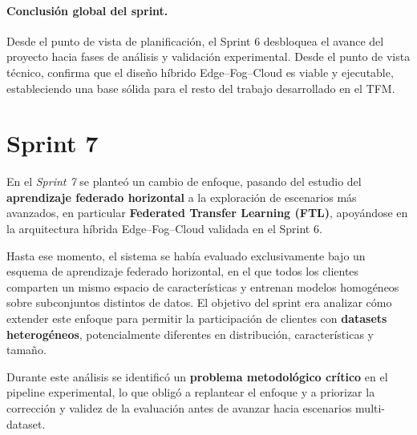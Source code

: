 \documentclass{report}
\begin{document}
\vspace{0.15em}
\paragraph{Conclusión global del sprint.}
Desde el punto de vista de planificación, el Sprint 6 desbloquea el avance del proyecto hacia fases de análisis y validación experimental. Desde el punto de vista técnico, confirma que el diseño híbrido Edge--Fog--Cloud es viable y ejecutable, estableciendo una base sólida para el resto del trabajo desarrollado en el TFM.




\section{Sprint 7}
\label{sect:Sp7}
En el \textit{Sprint 7} se planteó un cambio de enfoque, pasando del estudio del \textbf{aprendizaje federado horizontal} a la exploración de escenarios más avanzados, en particular \textbf{Federated Transfer Learning (FTL)}, apoyándose en la arquitectura híbrida Edge--Fog--Cloud validada en el Sprint 6.

Hasta ese momento, el sistema se había evaluado exclusivamente bajo un esquema de aprendizaje federado horizontal, en el que todos los clientes comparten un mismo espacio de características y entrenan modelos homogéneos sobre subconjuntos distintos de datos. El objetivo del sprint era analizar cómo extender este enfoque para permitir la participación de clientes con \textbf{datasets heterogéneos}, potencialmente diferentes en distribución, características y tamaño.

Durante este análisis se identificó un \textbf{problema metodológico crítico} en el pipeline experimental, lo que obligó a replantear el enfoque y a priorizar la corrección y validez de la evaluación antes de avanzar hacia escenarios multi-dataset.
\end{document}
